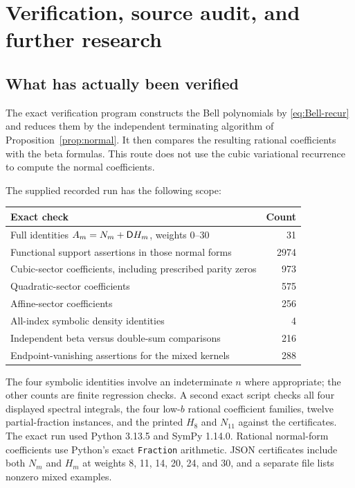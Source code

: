 \section{Verification, source audit, and further research}
\label{sec:audit}

\subsection{What has actually been verified}
The exact verification program constructs the Bell polynomials by
\eqref{eq:Bell-recur} and reduces them by the independent terminating
algorithm of Proposition~\ref{prop:normal}. It then compares the resulting
rational coefficients with the beta formulas. This route does not use the
cubic variational recurrence to compute the normal coefficients.

The supplied recorded run has the following scope:
\begin{center}
\begin{tabular}{lr}
\toprule
Exact check & Count\\
\midrule
Full identities $A_m=N_m+\mathsf D H_m$, weights $0$--$30$ & 31\\
Functional support assertions in those normal forms & 2974\\
Cubic-sector coefficients, including prescribed parity zeros & 973\\
Quadratic-sector coefficients & 575\\
Affine-sector coefficients & 256\\
All-index symbolic density identities & 4\\
Independent beta versus double-sum comparisons & 216\\
Endpoint-vanishing assertions for the mixed kernels & 288\\
\bottomrule
\end{tabular}
\end{center}
The four symbolic identities involve an indeterminate $n$ where
appropriate; the other counts are finite regression checks.
A second exact script checks all four displayed spectral integrals, the four
low-$b$ rational coefficient families, twelve partial-fraction instances, and
the printed $H_8$ and $N_{11}$ against the certificates.
The exact run used Python 3.13.5 and SymPy 1.14.0. Rational normal-form
coefficients use Python's exact \texttt{Fraction} arithmetic. JSON
certificates include both $N_m$ and $H_m$ at weights 8, 11, 14, 20, 24,
and 30, and a separate file lists nonzero mixed examples.

